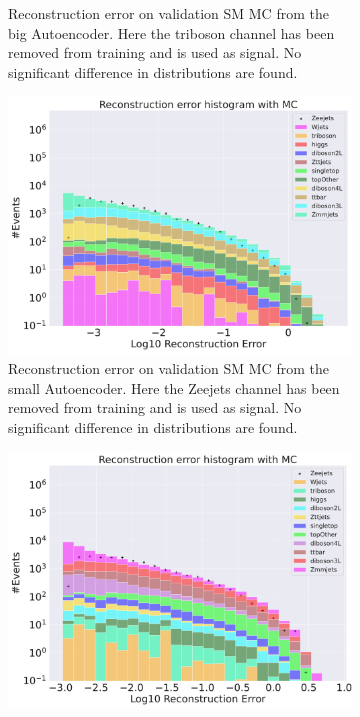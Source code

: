 \begin{figure}[h!]
\begin{subfigure}{.45\textwidth}
        \caption{Reconstruction error on validation SM MC from the big Autoencoder. Here the triboson channel has been removed from training and 
        is used as signal. No significant difference in distributions are found. }
        \label{fig:ae_big_triboson}
    \end{subfigure}
    \hfill  
    \caption{ }
    \label{fig:ae_big_channel4}
\end{figure}

\begin{figure}[h!]
    \centering
    \begin{subfigure}{.45\textwidth}
        \includegraphics[width=\textwidth]{Figures/AE_testing/small/b_data_recon_big_rm3_feats_sig_Zeejets.pdf}
        \caption{Reconstruction error on validation SM MC from the small Autoencoder. Here the Zeejets channel has been removed from training and 
        is used as signal. No significant difference in distributions are found.}
        \label{fig:ae_small_Zeejets}
    \end{subfigure}
    \hfill 
    \begin{subfigure}{.45\textwidth}
        \includegraphics[width=\textwidth]{Figures/AE_testing/big/b_data_recon_big_rm3_feats_sig_Zeejets.pdf}

\end{subfigure}
\end{figure}
